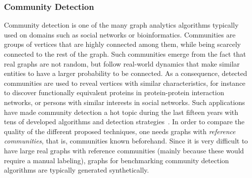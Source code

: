 \subsubsection{Community Detection}
\label{sec:generators_community_detection}

Community detection is one of the many graph analytics algorithms typically used on domains such as social networks or bioinformatics. Communities are groups of vertices that are highly connected among them, while being scarcely connected to the rest of the graph. Such communities emerge from the fact that real graphs are not random, but follow real-world dynamics that make similar entities to have a larger probability to be connected. As a consequence, detected communities are used to reveal vertices with similar characteristics, for instance to discover functionally equivalent proteins in protein-protein interaction networks, or persons with similar interests in social networks. Such applications have made community detection a hot topic during the last fifteen years with tens of developed algorithms and detection strategies~\cite{doi:10.1002/wics.1403,Kim:2015:CDM:2854006.2854013}. In order to compare the quality of the different proposed techniques, one needs graphs with \emph{reference communities}, that is, communities known beforehand. Since it is very difficult to have large real graphs with reference communities (mainly because these would require a manual labeling), graphs for benchmarking community detection algorithms are typically generated synthetically.

